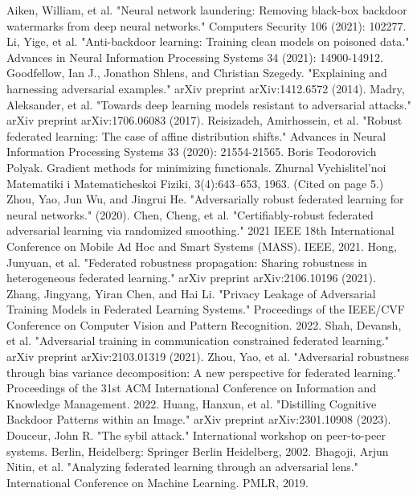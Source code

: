 \documentclass[conference]{IEEEtran}
\begin{document}
\begin{thebibliography}{00}
     Aiken, William, et al. "Neural network laundering: Removing black-box backdoor watermarks from deep neural networks." Computers  Security 106 (2021): 102277.
     Li, Yige, et al. "Anti-backdoor learning: Training clean models on poisoned data." Advances in Neural Information Processing Systems 34 (2021): 14900-14912.
     Goodfellow, Ian J., Jonathon Shlens, and Christian Szegedy. "Explaining and harnessing adversarial examples." arXiv preprint arXiv:1412.6572 (2014).
     Madry, Aleksander, et al. "Towards deep learning models resistant to adversarial attacks." arXiv preprint arXiv:1706.06083 (2017).
     Reisizadeh, Amirhossein, et al. "Robust federated learning: The case of affine distribution shifts." Advances in Neural Information Processing Systems 33 (2020): 21554-21565.
     Boris Teodorovich Polyak. Gradient methods for minimizing functionals. Zhurnal Vychislitel'noi Matematiki i Matematicheskoi Fiziki, 3(4):643–653, 1963. (Cited on page 5.)
     Zhou, Yao, Jun Wu, and Jingrui He. "Adversarially robust federated learning for neural networks." (2020).
     Chen, Cheng, et al. "Certifiably-robust federated adversarial learning via randomized smoothing." 2021 IEEE 18th International Conference on Mobile Ad Hoc and Smart Systems (MASS). IEEE, 2021.
     Hong, Junyuan, et al. "Federated robustness propagation: Sharing robustness in heterogeneous federated learning." arXiv preprint arXiv:2106.10196 (2021).
     Zhang, Jingyang, Yiran Chen, and Hai Li. "Privacy Leakage of Adversarial Training Models in Federated Learning Systems." Proceedings of the IEEE/CVF Conference on Computer Vision and Pattern Recognition. 2022.
     Shah, Devansh, et al. "Adversarial training in communication constrained federated learning." arXiv preprint arXiv:2103.01319 (2021).
     Zhou, Yao, et al. "Adversarial robustness through bias variance decomposition: A new perspective for federated learning." Proceedings of the 31st ACM International Conference on Information and Knowledge Management. 2022.
     Huang, Hanxun, et al. "Distilling Cognitive Backdoor Patterns within an Image." arXiv preprint arXiv:2301.10908 (2023).
     Douceur, John R. "The sybil attack." International workshop on peer-to-peer systems. Berlin, Heidelberg: Springer Berlin Heidelberg, 2002.
     Bhagoji, Arjun Nitin, et al. "Analyzing federated learning through an adversarial lens." International Conference on Machine Learning. PMLR, 2019.

\end{thebibliography}
\end{document}

